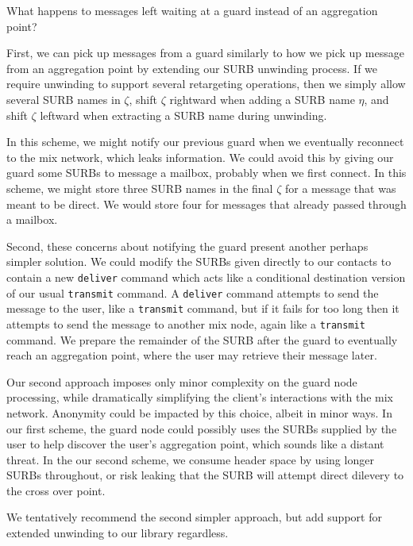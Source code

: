 \begin{issue}
What happens to messages left waiting at a guard instead of an
aggregation point?
\end{issue}

First, we can pick up messages from a guard similarly to how we pick
up message from an aggregation point by extending our SURB unwinding
process. If we require unwinding to support several retargeting
operations, then we simply allow several SURB names in $\zeta$,
 shift $\zeta$ rightward when adding a SURB name $\eta$, and
 shift $\zeta$ leftward when extracting a SURB name during unwinding.

In this scheme, we might notify our previous guard when we
eventually reconnect to the mix network, which leaks information.
We could avoid this by giving our guard some SURBs to message a
mailbox, probably when we first connect.  In this scheme, we might
store three SURB names in the final $\zeta$ for a message that was
meant to be direct.  We would store four for messages that already
passed through a mailbox.


Second, these concerns about notifying the guard present another
perhaps simpler solution.  We could modify the SURBs given directly
to our contacts to contain a new {\tt deliver} command which acts
like a conditional destination version of our usual {\tt transmit}
command.  A {\tt deliver} command attempts to send the message to
the user, like a {\tt transmit} command, but if it fails for too long
then it attempts to send the message to another mix node, again like
a {\tt transmit} command.  We prepare the remainder of the SURB after
the guard to eventually reach an aggregation point, where the user
may retrieve their message later.

Our second approach imposes only minor complexity on the guard node
processing, while dramatically simplifying the client's interactions
with the mix network.  Anonymity could be impacted by this choice,
albeit in minor ways.
%
In our first scheme, the guard node could possibly uses the SURBs
supplied by the user to help discover the user's aggregation point,
which sounds like a distant threat.  
%
In the our second scheme, we consume header space by using longer
SURBs throughout, or risk leaking that the SURB will attempt direct
dilevery to the cross over point.

We tentatively recommend the second simpler approach, but add support
for extended unwinding to our library regardless.


